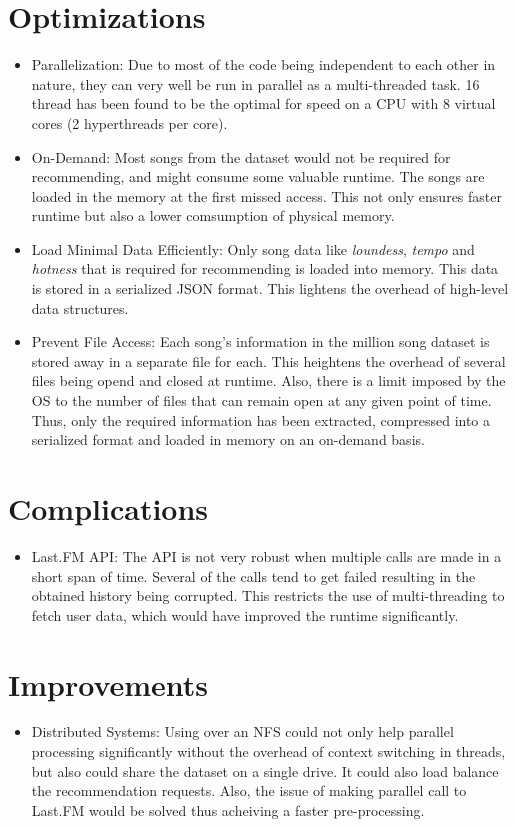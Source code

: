 	\section{Optimizations}
\begin{itemize}
	\item Parallelization: Due to most of the code being independent to each other in nature, they can very well be run in parallel as a multi-threaded task. 16 thread has been found to be the optimal for speed on a CPU with 8 virtual cores (2 hyperthreads per core).
	\item On-Demand: Most songs from the dataset would not be required for recommending, and might consume some valuable runtime. The songs are loaded in the memory at the first missed access. This not only ensures faster runtime but also a lower comsumption of physical memory.
	\item Load Minimal Data Efficiently: Only song data like \emph{loundess}, \emph{tempo} and \emph{hotness} that is required for recommending is loaded into memory. This data is stored in a serialized JSON format. This lightens the overhead of high-level data structures.
	\item Prevent File Access: Each song's information in the million song dataset is stored away in a separate file for each. This heightens the overhead of several files being opend and closed at runtime. Also, there is a limit imposed by the OS to the number of files that can remain open at any given point of time. Thus, only the required information has been extracted, compressed into a serialized format and loaded in memory on an on-demand basis.
\end{itemize}
	
	\section{Complications}
\begin{itemize}
	\item Last.FM API: The API is not very robust when multiple calls are made in a short span of time. Several of the calls tend to get failed resulting in the obtained history being corrupted. This restricts the use of multi-threading to fetch user data, which would have improved the runtime significantly.
\end{itemize}
	
	\section{Improvements}
\begin{itemize}
	\item Distributed Systems: Using over an NFS could not only help parallel processing significantly without the overhead of  context switching in threads, but also could share the dataset on a single drive. It could also load balance the recommendation requests. Also, the issue of making parallel call to Last.FM would be solved thus acheiving a faster pre-processing.
\end{itemize}

